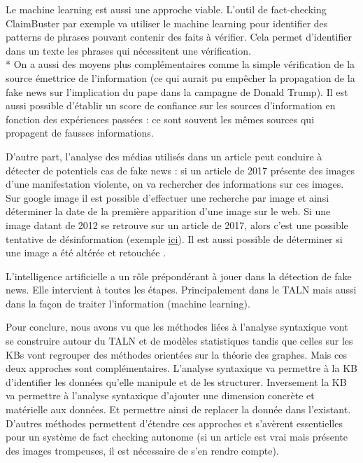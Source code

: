 Le machine learning est aussi une approche viable. L'outil de fact-checking ClaimBuster par exemple va utiliser le machine learning pour identifier des patterns de phrases pouvant contenir des faits à vérifier. Cela permet d'identifier dans un texte les phrases qui nécessitent une vérification. 
\\*
On a aussi des moyens plus complémentaires comme la simple vérification de la source émettrice de l'information (ce qui aurait pu empêcher la propagation de la fake news sur l'implication du pape dans la campagne  de Donald Trump). Il est aussi possible d'établir un score de confiance sur les sources d'information en fonction des expériences passées : ce sont souvent les mêmes sources qui propagent de fausses informations.

D'autre part, l'analyse des médias utilisés dans un article peut conduire à détecter de potentiels cas de fake news : si un article de 2017 présente des images d'une manifestation violente, on va rechercher des informations sur ces images. Sur google image il est possible d'effectuer une recherche par image et ainsi déterminer la date de la première apparition d'une image sur le web. Si une image datant de 2012 se retrouve sur un article de 2017, alors c'est une possible tentative de désinformation (exemple \href{https://www.lemonde.fr/les-decodeurs/article/2017/10/02/violences-policieres-en-catalogne-attention-aux-images-trompeuses_5194905_4355770.html}{ici}). Il est aussi possible de déterminer si une image a été altérée et retouchée \cite{krawetz2007picture}.

L'intelligence artificielle a un rôle prépondérant à jouer dans la détection de fake news. Elle intervient à toutes les étapes. Principalement dans le TALN mais aussi dans la façon de traiter l'information (machine learning).

Pour conclure, nous avons vu que les méthodes liées à l'analyse syntaxique vont se construire autour du TALN et de modèles statistiques tandis que celles sur les KBs vont regrouper des méthodes orientées sur la théorie des graphes. Mais ces deux approches sont complémentaires. L'analyse syntaxique va permettre à la KB d'identifier les données qu'elle manipule et de les structurer. Inversement la KB va permettre à l'analyse syntaxique d'ajouter une dimension concrète et matérielle aux données. Et permettre ainsi de replacer la donnée dans l'existant. D'autres méthodes permettent d'étendre ces approches et s'avèrent essentielles pour un système de fact checking autonome (si un article est vrai mais présente des images trompeuses, il est nécessaire de s'en rendre compte).

